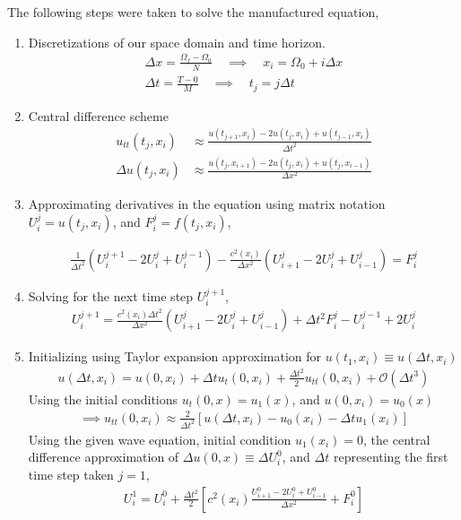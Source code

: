 \documentclass[11pt,a4paper]{article}
\begin{document}
The following steps were taken to solve the manufactured equation,

\begin{enumerate}
    \item Discretizations of our space domain and time horizon.
        \begin{align}
            \Delta x = \frac{\Omega_{f} - \Omega_{0}}{N} \quad \implies \quad x_{i}= \Omega_{0} +i\Delta x \\
            \Delta t = \frac{T-0}{M} \quad \implies \quad t_{j}= j\Delta t
        \end{align}
    \item Central difference scheme
        \begin{align}
            u_{tt}(t_{j}, x_{i}) &\approx \frac{u(t_{j+1}, x_{i}) - 2u(t_{j},x_{i}) + u(t_{j-1}, x_{i})}{\Delta t^2} \\
            \Delta u(t_{j},x_{i}) &\approx \frac{u(t_{j}, x_{i+1}) - 2u(t_{j},x_{i}) + u(t_{j}, x_{i-1})}{\Delta x^2}
        \end{align}
    \item Approximating derivatives in the equation using matrix notation $U_{i}^{j} = u(t_{j}, x_{i})$, and $F_{i}^{j} = f(t_{j}, x_{i})$,
        
        \begin{align}
            \frac{1}{\Delta t^2} \left( U_{i}^{j+1} - 2U_{i}^{j} + U_{i}^{j-1}\right) - \frac{c^2(x_i)}{\Delta x^2} \left( U_{i+1}^{j}- 2U_{i}^{j} + U_{i-1}^{j} \right) = F_{i}^{j}
        \end{align}

    \item Solving for the next time step $U_{i}^{j+1}$,
        \begin{align}
            U_{i}^{j+1} = \frac{c^2(x_{i})\Delta t^2}{\Delta x^2}(U_{i+1}^{j} - 2U_{i}^{j}+ U_{i-1}^{j}) + \Delta t^{2}F_{i}^{j} - U_{i}^{j-1} + 2 U_{i}^{j}
        \end{align}

    \item Initializing using Taylor expansion approximation for $u(t_{1},x_i)\equiv u(\Delta t, x_{i})$
        \begin{align}
            u(\Delta t, x_{i}) = u(0, x_{i}) + \Delta t u_{t}(0, x_{i}) + \frac{\Delta t^2}{2}u_{tt}(0, x_i) + \mathcal{O}(\Delta t^3)
        \end{align}
        Using the initial conditions $u_{t}(0, x) = u_{1}(x)$, and $u(0, x_i) = u_{0}(x)$
        \begin{align}
            \implies u_{tt}(0, x_i) \approx \frac{2}{\Delta t^{2}} \left[ u(\Delta t, x_{i}) - u_{0}(x_{i}) - \Delta t u_{1}(x_{i})\right]
        \end{align}
        Using the given wave equation, initial condition $u_{1}(x_{i})=0$, the central difference approximation of $\Delta u(0, x) \equiv \Delta U_{i}^{0}$, and $\Delta t$ representing the first time step taken $j=1$,
        \begin{align}
            U_{i}^{1} = U_{i}^{0} + \frac{\Delta t^2}{2} \left[ c^{2}(x_i)\frac{U_{i+1}^{0} - 2U_{i}^{0}+ U_{i-1}^{0}}{\Delta x^2}+F_{i}^{0} \right]
        \end{align}
    

\end{enumerate}
\end{document}

